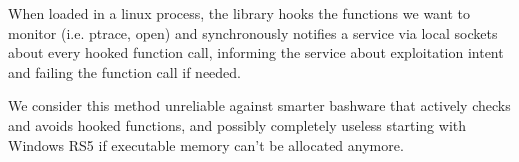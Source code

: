         When loaded in a linux process, the library hooks the functions we want to monitor (i.e. ptrace, open) and synchronously notifies a 
        service via local sockets about every hooked function call, informing the service about exploitation intent and failing the function call
        if needed.

        We consider this method unreliable against smarter bashware that actively checks and avoids hooked functions, and possibly completely useless
        starting with Windows RS5 if executable memory can't be allocated anymore.

